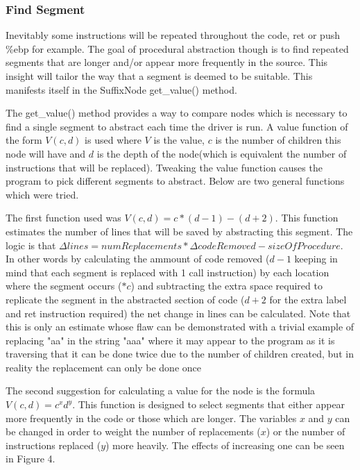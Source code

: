 \documentclass[9pt,nocopyrightspace]{sigplanconf}
\begin{document}
\subsubsection{Find Segment}

Inevitably some instructions will be repeated throughout the code, ret or push \%ebp for example.
The goal of procedural abstraction though is to find repeated segments that are longer and/or appear more frequently in the source.
This insight will tailor the way that a segment is deemed to be suitable.
This manifests itself in the SuffixNode get\_value() method.

The get\_value() method provides a way to compare nodes which is necessary to find a single segment to abstract each time the driver is run.
A value function of the form $V(c,d)$ is used where $V$ is the value, $c$ is the number of children this node will have and $d$ is the depth of the node(which is equivalent the number of instructions that will be replaced).
Tweaking the value function causes the program to pick different segments to abstract.
Below are two general functions which were tried.

The first function used was $V(c,d)=c*(d-1)-(d+2)$.
This function estimates the number of lines that will be saved by abstracting this segment.
The logic is that $\Delta lines=numReplacements*\Delta codeRemoved - sizeOfProcedure$.
In other words by calculating the ammount of code removed ($d-1$ keeping in mind that each segment is replaced with 1 call instruction) by each location where the segment occurs ($*c$) and subtracting the extra space required to replicate the segment in the abstracted section of code ($d+2$ for the extra label and ret instruction required) the net change in lines can be calculated.
Note that this is only an estimate whose flaw can be demonstrated with a trivial example of replacing "aa" in the string "aaa" where it may appear to the program as it is traversing that it can be done twice due to the number of children created, but in reality the replacement can only be done once

The second suggestion for calculating a value for the node is the formula $V(c,d)=c^{x}d^{y}$.
This function is designed to select segments that either appear more frequently in the code or those which are longer.
The variables $x$ and $y$ can be changed in order to weight the number of replacements ($x$) or the number of instructions replaced ($y$) more heavily.
The effects of increasing one can be seen in Figure 4.
\end{document}
